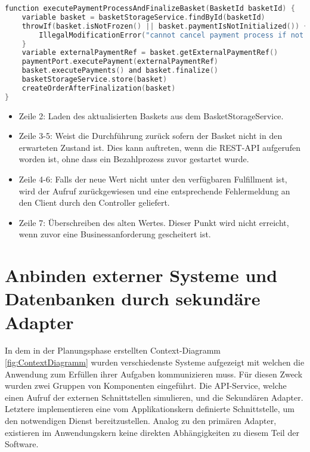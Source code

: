 \begin{minipage}{\linewidth} %
	\begin{lstlisting}[caption={Ausführung des Bezahlvorgangs in einem Domainservice}, label={lst:domainservice}, language=Kotlin]
function executePaymentProcessAndFinalizeBasket(BasketId basketId) {
	variable basket = basketStorageService.findById(basketId)
	throwIf(basket.isNotFrozen() || basket.paymentIsNotInitialized()) {
		IllegalModificationError("cannot cancel payment process if not payment initialized")
	}
	variable externalPaymentRef = basket.getExternalPaymentRef()
	paymentPort.executePayment(externalPaymentRef)
	basket.executePayments() and basket.finalize()
	basketStorageService.store(basket)
	createOrderAfterFinalization(basket)
}
	\end{lstlisting}
\end{minipage}

\begin{itemize}[noitemsep,nolistsep]
	\item Zeile 2: Laden des aktualisierten Baskets aus dem BasketStorageService.
	\item Zeile 3-5: Weist die Durchführung zurück sofern der Basket nicht in den erwarteten Zustand ist. Dies kann auftreten, wenn die REST-API aufgerufen worden ist, ohne dass ein Bezahlprozess zuvor gestartet wurde.
	\item Zeile 4-6: Falls der neue Wert nicht unter den verfügbaren Fulfillment ist, wird der Aufruf zurückgewiesen und eine entsprechende Fehlermeldung an den Client durch den Controller geliefert.
	\item Zeile 7: Überschreiben des alten Wertes. Dieser Punkt wird nicht erreicht, wenn zuvor eine Businessanforderung gescheitert ist.
\end{itemize}

\section{Anbinden externer Systeme und Datenbanken durch sekundäre Adapter}

In dem in der Planungsphase erstellten Context-Diagramm \ref{fig:ContextDiagramm} wurden verschiedenste Systeme aufgezeigt mit welchen die Anwendung zum Erfüllen ihrer Aufgaben kommunizieren muss. Für diesen Zweck wurden zwei Gruppen von Komponenten eingeführt. Die API-Service, welche einen Aufruf der externen Schnittstellen simulieren, und die Sekundären Adapter. Letztere implementieren eine vom Applikationskern definierte Schnittstelle, um den notwendigen Dienst bereitzustellen. Analog zu den primären Adapter, existieren im Anwendungskern keine direkten Abhängigkeiten zu diesem Teil der Software.

